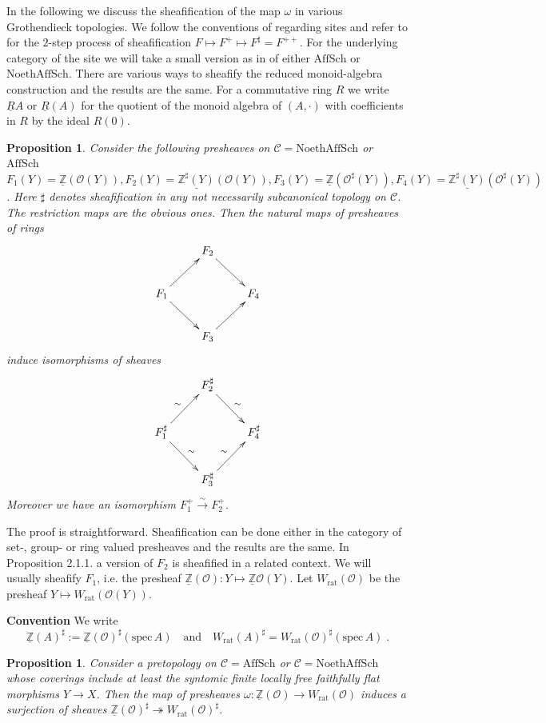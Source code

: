 \documentclass[12pt,leqno]{article}
\newcommand{\Z}{{\mathbb{Z}}}
\newcommand{\uZ}{\underline{\Z}}
\newcommand{\NAS}{\mathrm{NoethAffSch}}
\newcommand{\AS}{\mathrm{AffSch}}
\newcommand{\spec}{\mathrm{spec}\,}
\newcommand{\rat}{\mathrm{rat}}
\newcommand{\Ch}{{\mathcal C}}
\newcommand{\Oh}{{\mathcal O}}
\newcommand{\uR}{\underline{R}}
\newcommand{\silo}{\stackrel{\sim}{\rightarrow}}
\newtheorem{prop}[theorem]{Proposition}
\begin{document}
In the following we discuss the sheafification of the map $\omega$ in various Grothendieck topologies. We follow the conventions of \cite[7.6]{stacks} regarding sites and refer to \cite[7.10]{stacks} for the $2$-step process of sheafification $F \mapsto F^+ \mapsto F^{\sharp} = F^{++}$. For the underlying category of the site we will take a small version as in \cite{stacks} of either $\AS$ or $\NAS$. There are various ways to sheafify the reduced monoid-algebra construction and the results are the same. For a commutative ring $R$ we write $\uR A$ or $\uR (A)$ for the quotient of the monoid algebra of $(A , \cdot)$ with coefficients in $R$ by the ideal $R (0)$. 

\begin{prop}
\label{t4.2}
Consider the following presheaves on $\Ch = \NAS$ or $\AS$ $F_1 (Y) = \uZ (\Oh (Y)) , F_2 (Y) = \underline{\Z^{\sharp} (Y)} (\Oh (Y)) , F_3  (Y) = \uZ (\Oh^{\sharp} (Y)) , F_4 (Y) = \underline{\Z^{\sharp} (Y)} (\Oh^{\sharp} (Y))$. Here $\sharp$ denotes sheafification in any not necessarily subcanonical topology on $\Ch$. The restriction maps are the obvious ones. Then the natural maps of presheaves of rings
\[
\xymatrix{
 & F_2 \ar[dr] & \\
F_1 \ar[ur] \ar[dr] & & F_4\\
 & F_3 \ar[ur] & 
}
\]
induce isomorphisms of sheaves
\[
\xymatrix{
 & F^{\sharp}_2 \ar[dr]^{\sim} & \\
F^{\sharp}_1 \ar[ur]^{\sim} \ar[dr]^{\sim} & & F^{\sharp}_4\\
 & F^{\sharp}_3 \ar[ur]^{\sim} & 
}
\]
Moreover we have an isomorphism $F^+_1 \silo F^+_2$.
\end{prop}

The proof is straightforward. Sheafification can be done either in the category of set-, group- or ring valued presheaves and the results are the same. In \cite{V} Proposition 2.1.1. a version of $F_2$ is sheafified in a related context. We will usually sheafify $F_1$, i.e. the presheaf $\uZ (\Oh) : Y \mapsto \uZ \Oh (Y)$. Let $W_{\rat} (\Oh)$ be the presheaf $Y \mapsto W_{\rat} (\Oh (Y))$. 

\textbf{Convention} We write
\[
\uZ (A)^{\sharp} := \uZ (\Oh)^{\sharp} (\spec A) \quad \text{and} \quad W_{\rat} (A)^{\sharp} = W_{\rat} (\Oh)^{\sharp} (\spec A) \; .
\]

\begin{prop}
\label{t4.3}
Consider a pretopology on $\Ch = \AS$ or $\Ch = \NAS$ whose coverings include at least the syntomic finite locally free faithfully flat morphisms $Y \to X$. Then the map of presheaves $\omega : \uZ (\Oh) \to W_{\rat} (\Oh)$ induces a surjection of sheaves $\uZ (\Oh)^{\sharp} \twoheadrightarrow W_{\rat} (\Oh)^{\sharp}$.
\end{prop}
\end{document}
